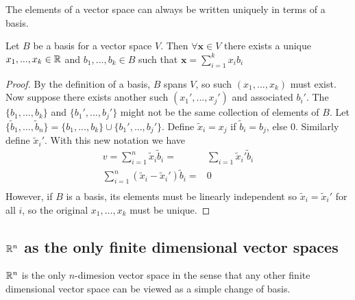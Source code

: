 The elements of a vector space can always be written uniquely in terms
of a basis.
\begin{lemma} \label{lem:uniqueRep}
  Let $B$ be a basis for a vector space $V$. Then
  $\forall \mathbf{x} \in V$ there exists a unique $x_1, ..., x_k \in \mathbb{R}$ and
  $b_1, ..., b_k \in B$
  such that $\mathbf{x} = \sum_{i=1}^k x_i b_i$  
\end{lemma}
\begin{proof}
  By the definition of a basis, $B$ spans $V$, so such
  $(x_1, ..., x_k)$ must exist. Now suppose there exists another such
  $(x_1', ..., x_j')$ and associated $b_i'$. The $\{b_1, ..., b_k\}$ and
  $\{b_1', ..., b_j'\}$ might not be the same collection of elements
  of $B$. Let $\{\tilde{b}_1, ..., \tilde{b}_n \} =  \{b_1, ...,
  b_k\} \cup \{b_1', ..., b_j'\}$. Define $\tilde{x}_i = x_j$ if
  $\tilde{b}_i = b_j$, else $0$. Similarly define $\tilde{x}_i'$. With
  this new notation we have
  \begin{align*}
    v = \sum_{i=1}^n \tilde{x}_i \tilde{b}_i = & \sum_{i=1} \tilde{x}_i' \tilde{b}_i \\
    \sum_{i=1}^n (\tilde{x}_i - \tilde{x}_i')\tilde{b}_i = & 0 \\
  \end{align*}
  However, if $B$ is a basis, its elements must be linearly
  independent so $\tilde{x}_i = \tilde{x}_i'$ for all $i$, so the
  original $x_1, ..., x_k$ must be unique.
\end{proof}

\subsection{$\mathbb{R}^n$ as the  only finite dimensional vector spaces}

$\mathbb{R}^n$ is the only $n$-dimesion vector space in the sense that any
other finite dimensional vector space can be viewed as a simple change
of basis.

